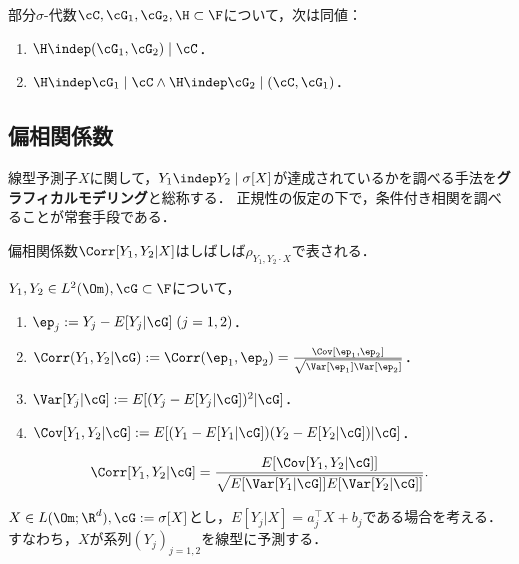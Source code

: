 \documentclass[uplatex,dvipdfmx]{jsreport}
\begin{document}
\begin{corollary}
    部分$\sigma$-代数$\cC,\cG_1,\cG_2,\H\subset\F$について，次は同値：
    \begin{enumerate}
        \item $\H\indep(\cG_1,\cG_2)\mid\cC$．
        \item $\H\indep\cG_1\mid\cC\land\H\indep\cG_2\mid(\cC,\cG_1)$．
    \end{enumerate}
\end{corollary}

\subsection{偏相関係数}

\begin{tcolorbox}[colframe=ForestGreen, colback=ForestGreen!10!white,breakable,colbacktitle=ForestGreen!40!white,coltitle=black,fonttitle=\bfseries\sffamily,
title=]
    線型予測子$X$に関して，$Y_1\indep Y_2\mid\sigma[X]$が達成されているかを調べる手法を\textbf{グラフィカルモデリング}と総称する．
    正規性の仮定の下で，条件付き相関を調べることが常套手段である．
\end{tcolorbox}

\begin{notation}
    偏相関係数$\Corr[Y_1,Y_2|X]$はしばしば$\rho_{Y_1,Y_2\cdot X}$で表される．
\end{notation}

\begin{definition}
    $Y_1,Y_2\in L^2(\Om),\cG\subset\F$について，
    \begin{enumerate}
        \item $\ep_j:=Y_j-E[Y_j|\cG]\;(j=1,2)$．
        \item $\Corr(Y_1,Y_2|\cG):=\Corr(\ep_1,\ep_2)=\frac{\Cov[\ep_1,\ep_2]}{\sqrt{\Var[\ep_1]\Var[\ep_2]}}$．
        \item $\Var[Y_j|\cG]:=E[(Y_j-E[Y_j|\cG])^2|\cG]$．
        \item $\Cov[Y_1,Y_2|\cG]:=E[(Y_1-E[Y_1|\cG])(Y_2-E[Y_2|\cG])|\cG]$．
    \end{enumerate}
\end{definition}

\begin{proposition}
    \[\Corr[Y_1,Y_2|\cG]=\frac{E[\Cov[Y_1,Y_2|\cG]]}{\sqrt{E[\Var[Y_1|\cG]]E[\Var[Y_2|\cG]]}}.\]
\end{proposition}

\begin{problem}
    $X\in L(\Om;\R^d),\cG:=\sigma[X]$とし，$E[Y_j|X]=a_j^\top X+b_j$である場合を考える．
    すなわち，$X$が系列$(Y_j)_{j=1,2}$を線型に予測する．
\end{problem}
\end{document}
